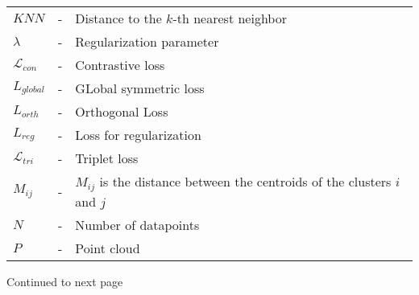 \begin{table}[H]
\begin{tabular}{|p{70pt}|p{30pt}|p{270pt}|}
      $KNN$ & - & Distance to the $k$-th nearest neighbor \\
      $\lambda$ & - & Regularization parameter \\
      $\mathcal{L}_{con}$	& -	& Contrastive loss \\
      $\mathit{L_{global}}$ & - & GLobal symmetric loss \\
      $\mathit{L_{orth}}$ & - & Orthogonal Loss \\
      $\mathit{L_{reg}}$ & - & Loss for regularization \\      
      $\mathcal{L}_{tri}$	& -	& Triplet loss \\
      $\mathit{M_{ij}}$ & - & $M_{ij}$ is the distance between the centroids of the clusters $i$ and $j$ \\
      $\mathit{N}$ & - & Number of datapoints \\
      $P$ & - & Point cloud \\
        
      \bottomrule
    \end{tabular}
\end{table}
\begin{flushright}
  Continued to next page
\end{flushright}

